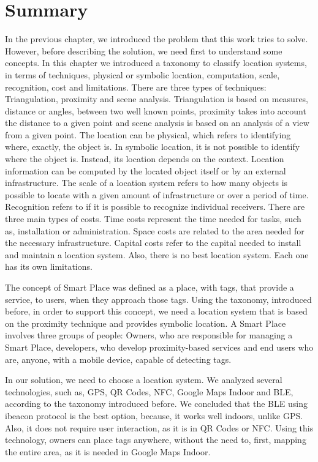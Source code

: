 \section{Summary}
\label{sec:background_summary}
In the previous chapter, we introduced the problem that this work tries to solve.
However, before describing the solution, we need first to understand some concepts.
In this chapter we introduced a taxonomy to classify location systems, in terms of techniques, physical or symbolic location, computation, scale, recognition, cost and limitations.
There are three types of techniques: Triangulation, proximity and scene analysis.
Triangulation is based on measures, distance or angles, between two well known points, proximity takes into account the distance to a given point and scene analysis is based on an analysis of a view from a given point.
The location can be physical, which refers to identifying where, exactly, the object is. In symbolic location, it is not possible to identify where the object is. Instead, its location depends on the context.
Location information can be computed by the located object itself or by an external infrastructure.
The scale of a location system refers to how many objects is possible to locate with a given amount of infrastructure or over a period of time.
Recognition refers to if it is possible to recognize individual receivers.
There are three main types of costs.
Time costs represent the time needed for tasks, such as, installation or administration.
Space costs are related to the area needed for the necessary infrastructure. Capital costs refer to the capital needed to install and maintain a location system.
Also, there is no best location system. Each one has its own limitations.

The concept of Smart Place was defined as a place, with tags, that provide a service, to users, when they approach those tags.
Using the taxonomy, introduced before, in order to support this concept, we need a location system that is based on the proximity technique and provides symbolic location.
A Smart Place involves three groups of people: Owners, who are responsible for managing a Smart Place, developers, who develop proximity-based services and end users who are, anyone, with a mobile device, capable of detecting tags.

In our solution, we need to choose a location system.
We analyzed several technologies, such as, \gls{GPS}, \gls{QR} Codes, \gls{NFC}, Google Maps Indoor and \gls{BLE}, according to the taxonomy introduced before.
We concluded that the \gls{BLE} using ibeacon protocol is the best option, because, it works well indoors, unlike \gls{GPS}.
Also, it does not require user interaction, as it is in \gls{QR} Codes or \gls{NFC}.
Using this technology, owners can place tags anywhere, without the need to, first, mapping the entire area, as it is needed in Google Maps Indoor.
